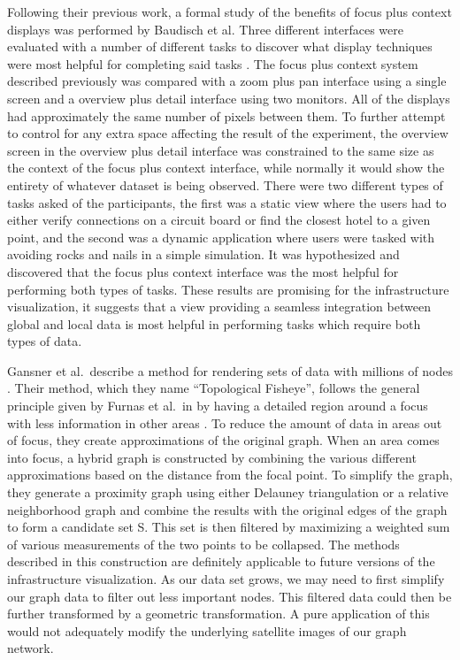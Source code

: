 Following their previous work, a formal study of the benefits of focus plus context displays was performed by Baudisch et al. Three different interfaces were evaluated with a number of different tasks to discover what display techniques were most helpful for completing said tasks \cite{Baudisch2002}. The focus plus context system described previously was compared with a zoom plus pan interface using a single screen and a overview plus detail interface using two monitors. All of the displays had approximately the same number of pixels between them. To further attempt to control for any extra space affecting the result of the experiment, the overview screen in the overview plus detail interface was constrained to the same size as the context of the focus plus context interface, while normally it would show the entirety of whatever dataset is being observed. There were two different types of tasks asked of the participants, the first was a static view where the users had to either
verify connections on a circuit board or find the closest hotel to a given point, and the second was a dynamic application where users were tasked with avoiding rocks and nails in a simple simulation. It was hypothesized and discovered that the focus plus context interface was the most helpful for performing both types of tasks. These results are promising for the infrastructure visualization, it suggests that a view providing a seamless integration between global and local data is most helpful in performing tasks which require both types of data. 

Gansner et al.\ describe a method for rendering sets of data with millions of nodes \cite{Gansner2005}. Their method, which they name ``Topological Fisheye'', follows the general principle given by Furnas et al.\ in  by having a detailed region around a focus with less information in other areas \cite{Furnas1986}. To reduce the amount of data in areas
out of focus, they create approximations of the original graph. When an area comes into focus, a hybrid graph is constructed by combining the various different approximations based on the distance from the focal point. To simplify the graph, they generate a proximity graph using either Delauney triangulation or a relative neighborhood graph and combine the results with the original edges of the graph to form a candidate set S. This set is then filtered by maximizing a weighted sum
of various measurements of the two points to be collapsed. The methods described in this construction are definitely applicable to future versions of the infrastructure visualization. As our data set grows, we may need to first simplify our graph data to filter out less important nodes. This filtered data could then be further transformed by a geometric transformation. A pure application of this would not adequately modify the underlying satellite images of our graph network.

